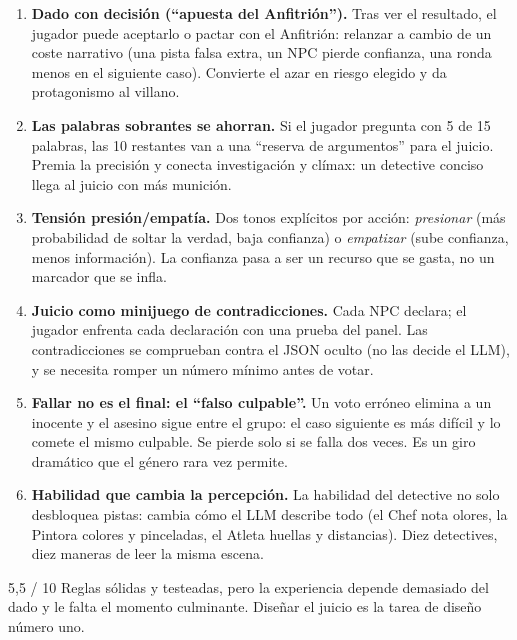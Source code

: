 \documentclass[11pt,a4paper]{article}
\begin{document}
\begin{inedito}
\begin{enumerate}
\item \textbf{Dado con decisión (``apuesta del Anfitrión'').} Tras ver el resultado, el jugador puede
aceptarlo o pactar con el Anfitrión: relanzar a cambio de un coste narrativo (una pista falsa extra,
un NPC pierde confianza, una ronda menos en el siguiente caso). Convierte el azar en riesgo
elegido y da protagonismo al villano.
\item \textbf{Las palabras sobrantes se ahorran.} Si el jugador pregunta con 5 de 15 palabras, las 10
restantes van a una ``reserva de argumentos'' para el juicio. Premia la precisión y conecta
investigación y clímax: un detective conciso llega al juicio con más munición.
\item \textbf{Tensión presión/empatía.} Dos tonos explícitos por acción: \emph{presionar} (más
probabilidad de soltar la verdad, baja confianza) o \emph{empatizar} (sube confianza, menos
información). La confianza pasa a ser un recurso que se gasta, no un marcador que se infla.
\item \textbf{Juicio como minijuego de contradicciones.} Cada NPC declara; el jugador enfrenta cada
declaración con una prueba del panel. Las contradicciones se comprueban contra el JSON oculto (no las
decide el LLM), y se necesita romper un número mínimo antes de votar.
\item \textbf{Fallar no es el final: el ``falso culpable''.} Un voto erróneo elimina a un inocente y
el asesino sigue entre el grupo: el caso siguiente es más difícil y lo comete el mismo culpable. Se
pierde solo si se falla dos veces. Es un giro dramático que el género rara vez permite.
\item \textbf{Habilidad que cambia la percepción.} La habilidad del detective no solo desbloquea
pistas: cambia cómo el LLM describe todo (el Chef nota olores, la Pintora colores y pinceladas, el
Atleta huellas y distancias). Diez detectives, diez maneras de leer la misma escena.
\end{enumerate}
\end{inedito}

\begin{veredicto}{5,5 / 10}
Reglas sólidas y testeadas, pero la experiencia depende demasiado del dado y le falta el momento
culminante. Diseñar el juicio es la tarea de diseño número uno.
\end{veredicto}

\end{document}
